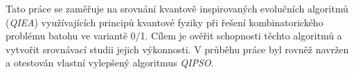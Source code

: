 \large
Tato práce se zaměřuje na srovnání kvantově inspirovaných evolučních algoritmů (\emph{QIEA}) využívajících principů kvantové fyziky při řešení kombinatorického problému batohu ve variantě 0/1.
Cílem je ověřit schopnosti těchto algoritmů a vytvořit srovnávací studii jejich výkonnosti.
V průběhu práce byl rovněž navržen a otestován vlastní vylepšený algoritmus \emph{QIPSO}.

